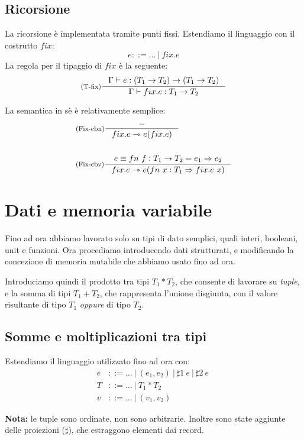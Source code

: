 \documentclass[a4paper, 11pt]{article}
\newcommand{\type}{\Gamma \vdash}
\begin{document}
\subsection{Ricorsione}
La ricorsione è implementata tramite punti fissi\footnotemark.  Estendiamo il linguaggio con il costrutto $fix$: \[ e::= \dots\ |\ fix.e \]
La regola per il tipaggio di $fix$ è la seguente: 
\[ 
	\inference[(T-fix)]{\type e: (T_1 \to T_2) \to (T_1 \to T_2)}{\type fix.e:T_1 \to T_2} 
\]


La semantica in sè è relativamente semplice: 
\begin{align*}
	&\inference[(Fix-cbn)]{-}{fix.e \rightarrowtriangle e(fix.e)} \\ \\
	&\inference[(Fix-cbv)]{e \equiv fn\ f: T_1 \to T_2 = e_1 \Rightarrow e_2}{fix.e \rightarrowtriangle e(fn\ x :T_1 \Rightarrow fix.e\ x)}
\end{align*}


\section{Dati e memoria variabile}

Fino ad ora abbiamo lavorato solo su tipi di dato semplici, quali interi, booleani, unit e funzioni. Ora procediamo introducendo dati strutturati, e modificando la concezione di memoria mutabile che abbiamo usato fino ad ora. 

Introduciamo quindi il prodotto tra tipi $T_1 * T_2$, che consente di lavorare su \textit{tuple}, e la somma di tipi $T_1 + T_2$, che rappresenta l'unione disgiunta, con il valore risultante di tipo $T_1$ \textit{oppure} di tipo $T_2$.

\subsection{Somme e moltiplicazioni tra tipi}
Estendiamo il linguaggio utilizzato fino ad ora con: \begin{align*}
	e &::= \dots\ |\ (e_1,e_2)\ |\ \sharp1\ e\ |\ \sharp2\ e\ \\
	T &::= \dots\ |\ T_1 * T_2 \\
	v &::= \dots\ |\ (v_1, v_2)
\end{align*}

\textbf{Nota:} le tuple sono ordinate, non sono arbitrarie.
Inoltre sono state aggiunte delle proiezioni ($\sharp$), che estraggono elementi dai record.
\end{document}
